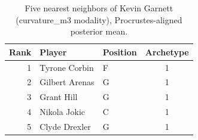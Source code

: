 \begin{table}[htbp]
  \centering\small
  \begin{tabular}{rllc}
    \toprule
    Rank & Player & Position & Archetype \\
    \midrule
    1 & Tyrone Corbin & F & 1 \\
    2 & Gilbert Arenas & G & 1 \\
    3 & Grant Hill & G & 1 \\
    4 & Nikola Jokic & C & 1 \\
    5 & Clyde Drexler & G & 1 \\
    \bottomrule
  \end{tabular}
  \caption{Five nearest neighbors of Kevin Garnett (curvature_m3 modality), Procrustes-aligned posterior mean.}
  \label{tab:Kevin_Garnett_neighbors_curvature_m3}
\end{table}

